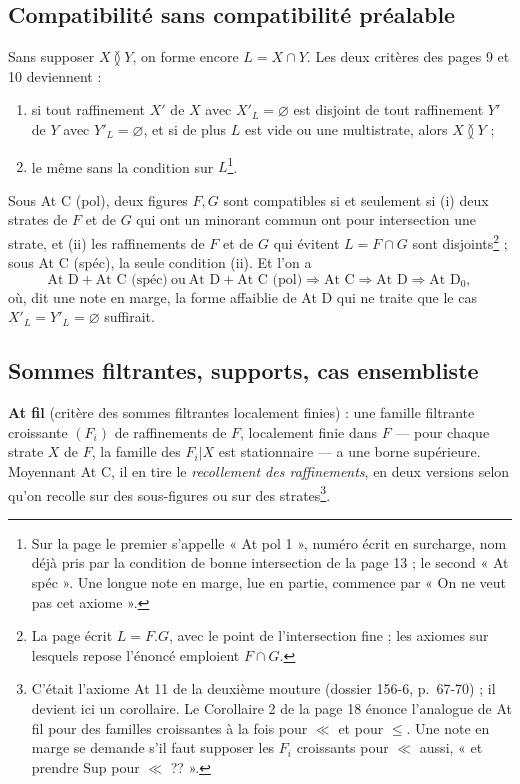 \documentclass[11pt,a4paper]{article}
\begin{document}
\subsection*{Compatibilité sans compatibilité préalable}

Sans supposer $X \between Y$, on forme encore $L = X \cap Y$. Les deux critères
des pages 9 et 10 deviennent :
\begin{enumerate}
\item[\textbf{At C (pol)}] si tout raffinement $X'$ de $X$ avec $X'_{L} =
\varnothing$ est disjoint de tout raffinement $Y'$ de $Y$ avec $Y'_{L} =
\varnothing$, et si de plus $L$ est vide ou une multistrate, alors $X \between Y$ ;
\item[\textbf{At C (spéc)}] le même sans la condition sur $L$\footnote{Sur la page
le premier s'appelle « At pol 1 », numéro écrit en surcharge, nom déjà pris par
la condition de bonne intersection de la page 13 ; le second « At spéc ». Une
longue note en marge, lue en partie, commence par « On ne veut pas cet
axiome ».}.
\end{enumerate}
Sous At C (pol), deux figures $F, G$ sont compatibles si et seulement si (i)
deux strates de $F$ et de $G$ qui ont un minorant commun ont pour intersection
une strate, et (ii) les raffinements de $F$ et de $G$ qui évitent $L = F \cap G$
sont disjoints\footnote{La page écrit $L = F.G$, avec le point de
l'intersection fine ; les axiomes sur lesquels repose l'énoncé emploient $F \cap
G$.} ; sous At C (spéc), la seule condition (ii). Et l'on a
\[
\text{At D} + \text{At C (spéc)} \ \text{ou}\ \text{At D} + \text{At C (pol)}
\Longrightarrow \text{At C} \Longrightarrow \text{At D} \Longrightarrow
\text{At D}_{0} ,
\]
où, dit une note en marge, la forme affaiblie de At D qui ne traite que le cas
$X'_{L} = Y'_{L} = \varnothing$ suffirait.

\subsection*{Sommes filtrantes, supports, cas ensembliste}

\textbf{At fil} (critère des sommes filtrantes localement finies) : une famille
filtrante croissante $(F_{i})$ de raffinements de $F$, localement finie dans $F$
--- pour chaque strate $X$ de $F$, la famille des $F_{i}|X$ est stationnaire ---
a une borne supérieure. Moyennant At C, il en tire le \emph{recollement des
raffinements}, en deux versions selon qu'on recolle sur des sous-figures ou sur
des strates\footnote{C'était l'axiome At 11 de la deuxième mouture (dossier
156-6, p.~67-70) ; il devient ici un corollaire. Le Corollaire 2 de la page 18
énonce l'analogue de At fil pour des familles croissantes à la fois pour $\ll$ et
pour $\leq$. Une note en marge se demande
s'il faut supposer les $F_{i}$ croissants pour $\ll$ aussi, « et prendre Sup
pour $\ll$ ?? ».}.
\end{document}
